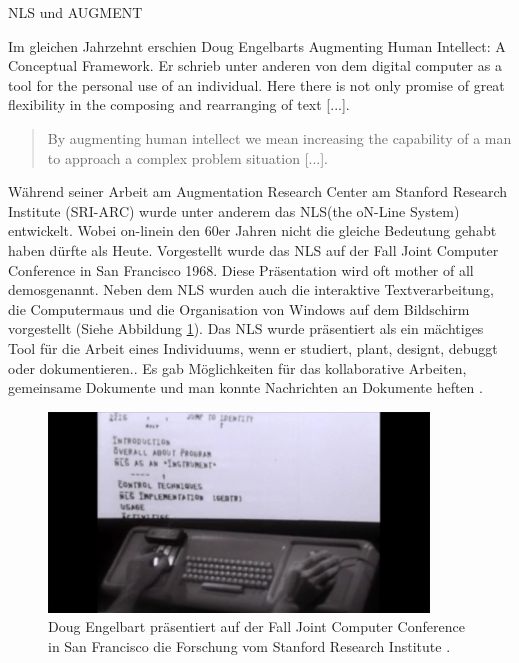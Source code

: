 \begin{section}{NLS und AUGMENT}
\label{sec:nls}

Im gleichen Jahrzehnt erschien Doug Engelbarts \glqq Augmenting Human Intellect: A Conceptual Framework\grqq{ }. Er schrieb unter anderen von dem \glqq digital computer as a tool for the personal use of an individual. Here there is not only promise of great flexibility in the composing and rearranging of text [...]\grqq{ }\cite[S. 17]{Engelbart1962}.

\begin{quote}
\glqq By augmenting human intellect we mean increasing the capability of a man to approach a complex problem situation [...].\grqq{ }\cite[S. 1]{Engelbart1962}
\end{quote}

Während seiner Arbeit am Augmentation Research Center am Stanford Research Institute (SRI-ARC) wurde unter anderem das \glqq NLS\grqq{ }(the oN-Line System) entwickelt. Wobei \glqq on-line\grqq{ }in den 60er Jahren nicht die gleiche Bedeutung gehabt haben dürfte als Heute. Vorgestellt wurde das NLS auf der Fall Joint Computer Conference in San Francisco 1968. Diese Präsentation wird oft \glqq mother of all demos\grqq{ }genannt. Neben dem NLS wurden auch die interaktive Textverarbeitung, die Computermaus und die Organisation von Windows auf dem Bildschirm vorgestellt (Siehe Abbildung \ref{fig:mother}). Das NLS wurde präsentiert als \glqq ein mächtiges Tool für die Arbeit eines Individuums, wenn er studiert, plant, designt, debuggt oder dokumentieren.\grqq{ }\cite{MotherOfDemo1968}. Es gab Möglichkeiten für das kollaborative Arbeiten, gemeinsame Dokumente und man konnte Nachrichten an Dokumente heften \cite{MotherOfDemo1968}. 

\begin{figure}[!ht]
	\centering
	\includegraphics[width=0.9\textwidth]{image/mother}
	\caption{Doug Engelbart präsentiert auf der Fall Joint Computer Conference in San Francisco die Forschung vom Stanford Research Institute \cite{MotherOfDemo1968}.}
	\label{fig:mother}
\end{figure}


\end{section}
